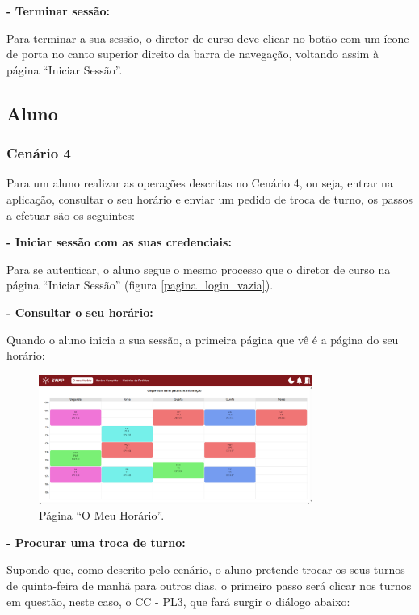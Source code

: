 \documentclass[12pt, a4paper]{article}
\begin{document}
\textbf{- Terminar sessão:}

Para terminar a sua sessão, o diretor de curso deve clicar no botão com um ícone de porta no canto
superior direito da barra de navegação, voltando assim à página ``Iniciar Sessão''.

\subsection{Aluno}

\subsubsection{Cenário 4}

Para um aluno realizar as operações descritas no Cenário 4, ou seja, entrar na aplicação, consultar
o seu horário e enviar um pedido de troca de turno, os passos a efetuar são os seguintes:

\textbf{- Iniciar sessão com as suas credenciais:}

Para se autenticar, o aluno segue o mesmo processo que o diretor de curso na página
``Iniciar Sessão'' (figura \ref{pagina_login_vazia}).

\textbf{- Consultar o seu horário:}

Quando o aluno inicia a sua sessão, a primeira página que vê é a página do seu horário:

\begin{figure}[H]
    \centering
    \includegraphics[width=0.8\textwidth]{res/manual/pagina_o_meu_horario.png}
    \caption{Página ``O Meu Horário''.}
    \label{meu_horario}
\end{figure}

\textbf{- Procurar uma troca de turno:}

Supondo que, como descrito pelo cenário, o aluno pretende trocar os seus turnos de quinta-feira de
manhã para outros dias, o primeiro passo será clicar nos turnos em questão, neste caso, o CC - PL3,
que fará surgir o diálogo abaixo:
\end{document}
